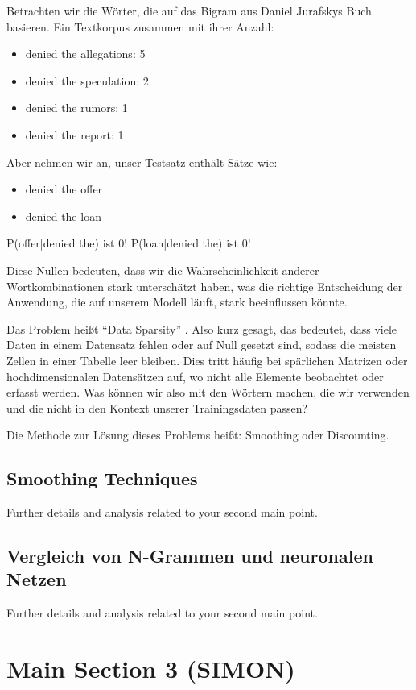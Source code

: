 \documentclass[12pt]{article}
\begin{document}
Betrachten wir die Wörter, die auf das Bigram aus Daniel Jurafskys Buch basieren. Ein Textkorpus zusammen mit ihrer Anzahl:

\begin{itemize}
  \item denied the allegations: 5
  \item denied the speculation: 2
  \item denied the rumors: 1
  \item denied the report: 1
\end{itemize}

Aber nehmen wir an, unser Testsatz enthält Sätze wie:
\begin{itemize}
  \item denied the offer
  \item denied the loan
\end{itemize}

P(offer|denied the) ist 0!
P(loan|denied the) ist 0!

Diese Nullen bedeuten, dass wir die Wahrscheinlichkeit anderer Wortkombinationen stark unterschätzt haben, was die richtige Entscheidung der Anwendung, die auf unserem Modell läuft, stark beeinflussen könnte.

Das Problem heißt “Data Sparsity” \cite{dremio2023}. Also kurz gesagt, das bedeutet, dass viele Daten in einem Datensatz fehlen oder auf Null gesetzt sind, sodass die meisten Zellen in einer Tabelle leer bleiben. Dies tritt häufig bei spärlichen Matrizen oder hochdimensionalen Datensätzen auf, wo nicht alle Elemente beobachtet oder erfasst werden. Was können wir also mit den Wörtern machen, die wir verwenden und die nicht in den Kontext unserer Trainingsdaten passen?

Die Methode zur Lösung dieses Problems heißt: Smoothing oder Discounting.

\subsection{Smoothing Techniques}
Further details and analysis related to your second main point.

\subsection{Vergleich von N-Grammen und neuronalen Netzen}
Further details and analysis related to your second main point.

\section{Main Section 3 (SIMON)}
\end{document}
